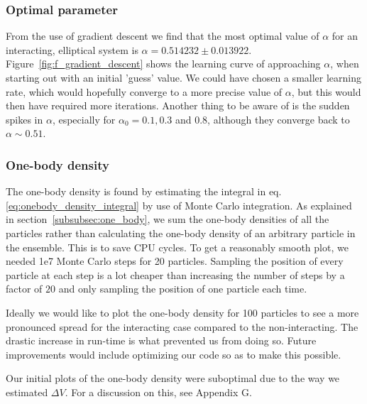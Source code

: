 \documentclass[
    a4paper, aps, twocolumn, floatfix, superscriptaddress,
    nofootinbib]{revtex4-1}
\begin{document}
\subsubsection{Optimal parameter}
From the use of gradient descent we find that the most optimal value of $\alpha$ for an interacting, elliptical system is $\alpha = 0.514232\pm 0.013922$. Figure~\ref{fig:f_gradient_descent} shows the learning curve of approaching $\alpha$, when starting out with an initial 'guess' value. We could have chosen a smaller learning rate, which would hopefully converge to a more precise value of $\alpha$, but this would then have required more iterations. Another thing to be aware of is the sudden spikes in $\alpha$, especially for $\alpha_0 = 0.1, 0.3$ and 0.8, although they converge back to $\alpha \sim 0.51$.

\subsubsection{One-body density}
The one-body density is found by estimating the integral in eq. \eqref{eq:onebody_density_integral} by use of Monte Carlo integration. As explained in section~\ref{subsubsec:one_body}, we sum the one-body densities of all the particles rather than calculating the one-body density of an arbitrary particle in the ensemble. This is to save CPU cycles. To get a reasonably smooth plot, we needed 1e7 Monte Carlo steps for 20 particles. Sampling the position of every particle at each step is a lot cheaper than increasing the number of steps by a factor of $20$ and only sampling the position of one particle each time.

Ideally we would like to plot the one-body density for 100 particles to see a more pronounced spread for the interacting case compared to the non-interacting. The drastic increase in run-time is what prevented us from doing so. Future improvements would include optimizing our code so as to make this possible. 

Our initial plots of the one-body density were suboptimal due to the way we estimated $\Delta V$. For a discussion on this, see Appendix G.


\end{document}
